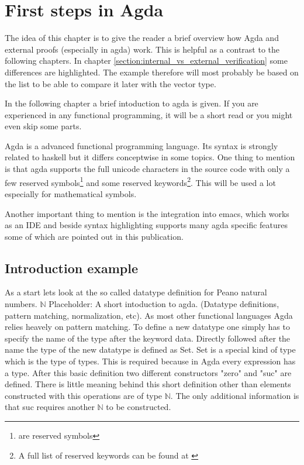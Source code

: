 \section{First steps in Agda}\label{section:first_steps_in_agda}
The idea of this chapter is to give the reader a brief overview how Agda and external proofs (especially in agda) work. This is helpful as a contrast to the following chapters. 
In chapter \ref{section:internal_vs_external_verification} some differences are highlighted. The example therefore will most probably be based on the list to be able to compare it later with the vector type.

In the following chapter a brief intoduction to agda is given. If you are experienced in any functional programming, it will be a short read or you might even skip some parts.

Agda is a advanced functional programming language. Its syntax is strongly related to haskell but it differs conceptwise in some topics. 
One thing to mention is that agda supports the full unicode characters in the source code with only a few reserved symbols\footnote{ are reserved symbols\cite{AgdaReadTheDocsStructure}} 
and some reserved keywords\footnote{A full list of reserved keywords can be found at \cite{AgdaReadTheDocsStructure}}. This will be used a lot especially for mathematical symbols.

Another important thing to mention is the integration into emacs, which works as an IDE and beside syntax highlighting supports many agda specific features some of which are pointed out in this publication.

\subsection{Introduction example}\label{section:agda_introduction_example}
As a start lets look at the so called datatype definition for Peano natural numbers. $\mathbb{N}$
Placeholder: A short intoduction to agda. (Datatype definitions, pattern matching, normalization, etc).
As most other functional languages Agda relies heavely on pattern matching. 
To define a new datatype one simply has to specify the name of the type after the keyword data. Directly followed after the name the type of the new datatype is defined as Set. 
Set is a special kind of type which is the type of types. This is required because in Agda every expression has a type. 
After this basic definition two different constructors "zero" and "suc" are defined. 
There is little meaning behind this short definition other than elements constructed with this operations are of type $\mathbb{N}$.
The only additional information is that suc requires another $\mathbb{N}$ to be constructed.

